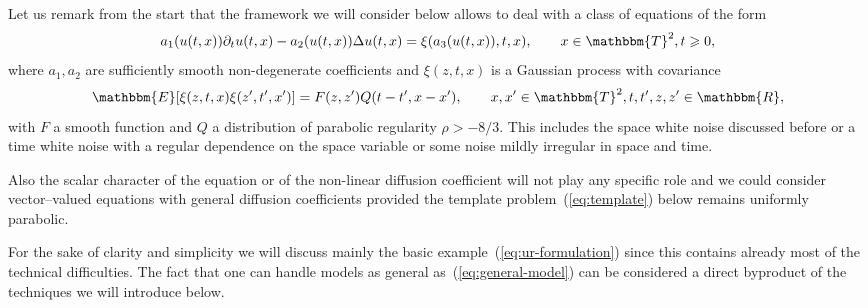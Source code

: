 \documentclass[11pt,reqno]{amsart}
\begin{document}
Let us remark from the start that the framework we will consider below allows
to deal with a class of equations of the form
\begin{equation}
  a_1 (u (t, x)) \partial_t u (t, x) - a_2 (u (t, x)) \Delta u (t, x) = \xi
  (a_3 (u (t, x)), t, x), \qquad x \in \mathbbm{T}^2, t \geqslant 0,
  \label{eq:general-model}
\end{equation}
where $a_1, a_2$ are sufficiently smooth non-degenerate coefficients and $\xi
(z, t, x)$ is a Gaussian process with covariance
\[ \mathbbm{E} [\xi (z, t, x) \xi (z', t', x')] = F (z, z') Q (t - t', x -
   x'), \qquad x, x' \in \mathbbm{T}^2, t, t', z, z' \in \mathbbm{R}, \]
with $F$ a smooth function and $Q$ a distribution of parabolic regularity
$\rho > - 8 / 3$. This includes the space white noise discussed before or a
time white noise with a regular dependence on the space variable or some noise
mildly irregular in space and time.

Also the scalar character of the equation or of the non-linear diffusion
coefficient will not play any specific role and we could consider
vector--valued equations with general diffusion coefficients provided the
template problem~(\ref{eq:template}) below remains uniformly parabolic.

For the sake of clarity and simplicity we will discuss mainly the basic
example~(\ref{eq:ur-formulation}) since this contains already most of the
technical difficulties. The fact that one can handle models as general
as~(\ref{eq:general-model}) can be considered a direct byproduct of the
techniques we will introduce below.
\end{document}
